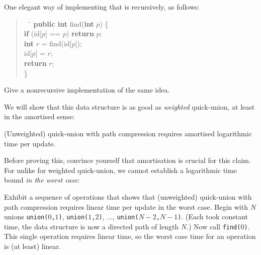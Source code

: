 \documentclass{tstextbook}
\begin{document}
One elegant way of implementing that is recursively, as follows:
\begin{quote}
\begin{tabbing}
  $\quad$\=\kill
  \textbf{public int} find(\textbf{int} $p$) \{\\
  \>  \textbf{if} (id[$p$] == $p$) \textbf{return} $p$;\\
  \>  \textbf{int} $r$ = find(id[$p$]);\\
\>  id[$p$] = $r$;\\
  \>  \textbf{return} $r$;\\
  \}
\end{tabbing}
\end{quote}

\begin{ExerciseList}
  \Exercise{} 
  Give a nonrecursive implementation of the same idea. 
\end{ExerciseList}

We will show that this data structure is as good as \emph{weighted} quick-union, at least in the amortised sense:

\begin{theorem}[Exercise 1.5.12 in SW]\label{prop: path compression}
  (Unweighted) quick-union with path compression requires amortised logarithmic time per update.
\end{theorem}

Before proving this, convince yourself that amortisation is crucial for this claim.
For unlike for weighted quick-union, we cannot establish a logarithmic time bound \emph{in the worst case}:

\begin{ExerciseList}
  \Exercise{} Exhibit a sequence of operations that shows that (unweighted) quick-union with path compression requires linear time per update in the worst case.
  \Answer{}  Begin with $N$ unions
  \texttt{union($0$,$1$)}, 
  \texttt{union($1$,$2$)}, 
  $\ldots$, 
  \texttt{union($N-2$,$N-1$)}.
  (Each took constant time, the data structure is now a directed path of length $N$.)
  Now call \texttt{find($0$)}.
  This single operation requires linear time, so the worst case time for an operation is (at least) linear.
\end{ExerciseList}
\end{document}
